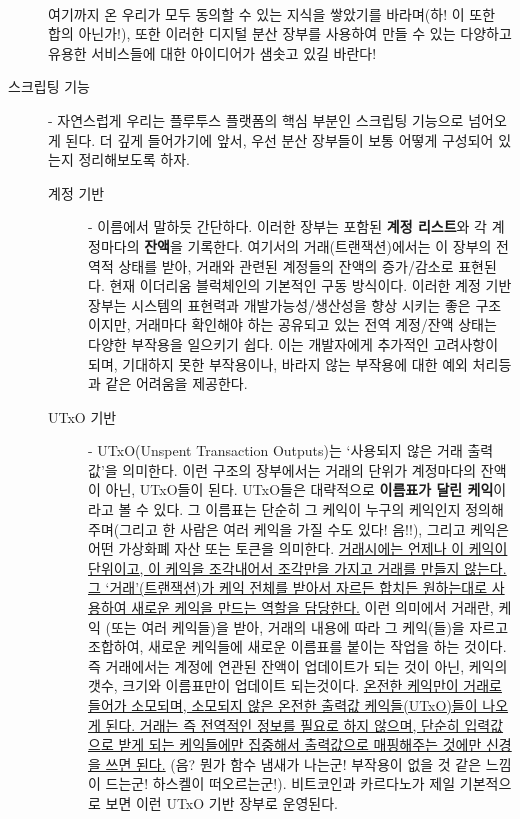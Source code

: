 \documentclass[a4paper, 11pt]{article}
\begin{document}
\begin{description}
        \paragraph{} 여기까지 온 우리가 모두 동의할 수 있는 지식을 쌓았기를 바라며(하! 이 또한 합의 아닌가!), 또한 이러한 디지털 분산 장부를 사용하여 만들 수 있는 다양하고 유용한 서비스들에 대한 아이디어가 샘솟고 있길 바란다!
        
        \item[스크립팅 기능] - 자연스럽게 우리는 플루투스 플랫폼의 핵심 부분인 스크립팅 기능으로 넘어오게 된다. 더 깊게 들어가기에 앞서, 우선 분산 장부들이 보통 어떻게 구성되어 있는지 정리해보도록 하자.
        
        \begin{description}
            \item[계정 기반] - 이름에서 말하듯 간단하다. 이러한 장부는 포함된 \textbf{계정 리스트}와 각 계정마다의 \textbf{잔액}을 기록한다. 여기서의 거래(트랜잭션)에서는 이 장부의 전역적 상태를 받아, 거래와 관련된 계정들의 잔액의 증가/감소로 표현된다. 현재 이더리움 블럭체인의 기본적인 구동 방식이다. 이러한 계정 기반 장부는 시스템의 표현력과 개발가능성/생산성을 향상 시키는 좋은 구조이지만, 거래마다 확인해야 하는 공유되고 있는 전역 계정/잔액 상태는 다양한 부작용을 일으키기 쉽다. 이는 개발자에게 추가적인 고려사항이 되며, 기대하지 못한 부작용이나, 바라지 않는 부작용에 대한 예외 처리등과 같은 어려움을 제공한다.

            \item[UTxO 기반] - UTxO(Unspent Transaction Outputs)는 `사용되지 않은 거래 출력값'을 의미한다. 이런 구조의 장부에서는 거래의 단위가 계정마다의 잔액이 아닌, UTxO들이 된다. UTxO들은 대략적으로 \textbf{이름표가 달린 케익}이라고 볼 수 있다. 그 이름표는 단순히 그 케익이 누구의 케익인지 정의해주며(그리고 한 사람은 여러 케익을 가질 수도 있다! 음!!), 그리고 케익은 어떤 가상화폐 자산 또는 토큰을 의미한다. \uline{거래시에는 언제나 이 케익이 단위이고, 이 케익을 조각내어서 조각만을 가지고 거래를 만들지 않는다. 그 `거래'(트랜잭션)가 케익 전체를 받아서 자르든 합치든 원하는대로 사용하여 새로운 케익을 만드는 역할을 담당한다.} 이런 의미에서 거래란, 케익 (또는 여러 케익들)을 받아, 거래의 내용에 따라 그 케익(들)을 자르고 조합하여, 새로운 케익들에 새로운 이름표를 붙이는 작업을 하는 것이다. 즉 거래에서는 계정에 연관된 잔액이 업데이트가 되는 것이 아닌, 케익의 갯수, 크기와 이름표만이 업데이트 되는것이다. \uline{온전한 케익만이 거래로 들어가 소모되며, 소모되지 않은 온전한 출력값 케익들(UTxO)들이 나오게 된다. 거래는 즉 전역적인 정보를 필요로 하지 않으며, 단순히 입력값으로 받게 되는 케익들에만 집중해서 출력값으로 매핑해주는 것에만 신경을 쓰면 된다.} (음? 뭔가 함수 냄새가 나는군! 부작용이 없을 것 같은 느낌이 드는군! 하스켈이 떠오르는군!). 비트코인과 카르다노가 제일 기본적으로 보면 이런 UTxO 기반 장부로 운영된다.
        \end{description}


\end{description}
\end{document}
